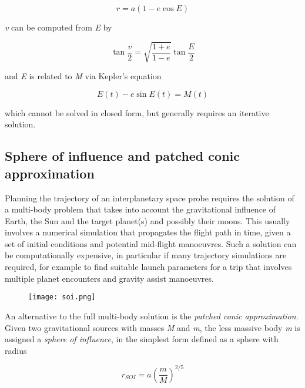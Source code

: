 \documentclass[Orbiter User Manual.tex]{subfiles}
\begin{document}
\[ r = a (1 - e \cos E) \]

\noindent
\textit{v} can be computed from \textit{E} by

\[ \tan \frac{v}{2} = \sqrt{\frac{1 + e}{1 - e}} \tan \frac{E}{2} \]

\noindent
and \textit{E} is related to \textit{M} via Kepler's equation

\[ E(t) - e \sin E(t) = M(t) \]

\noindent
which cannot be solved in closed form, but generally requires an iterative solution.

\subsection{Sphere of influence and patched conic approximation}
Planning the trajectory of an interplanetary space probe requires the solution of a multi-body problem that takes into account the gravitational influence of Earth, the Sun and the target planet(s) and possibly their moons. This usually involves a numerical simulation that propagates the flight path in time, given a set of initial conditions and potential mid-flight manoeuvres. Such a solution can be computationally expensive, in particular if many trajectory simulations are required, for example to find suitable launch parameters for a trip that involves multiple planet encounters and gravity assist manoeuvres.

\begin{figure}[H]
	\centering
	\texttt{[image: soi.png]}
\end{figure}

\noindent
An alternative to the full multi-body solution is the \textit{patched conic approximation}. Given two gravitational sources with masses \textit{M} and \textit{m}, the less massive body \textit{m} is assigned a \textit{sphere of influence}, in the simplest form defined as a sphere with radius

\[ r_{SOI} = a \left( \frac{m}{M} \right)^{2/5} \]
\end{document}
